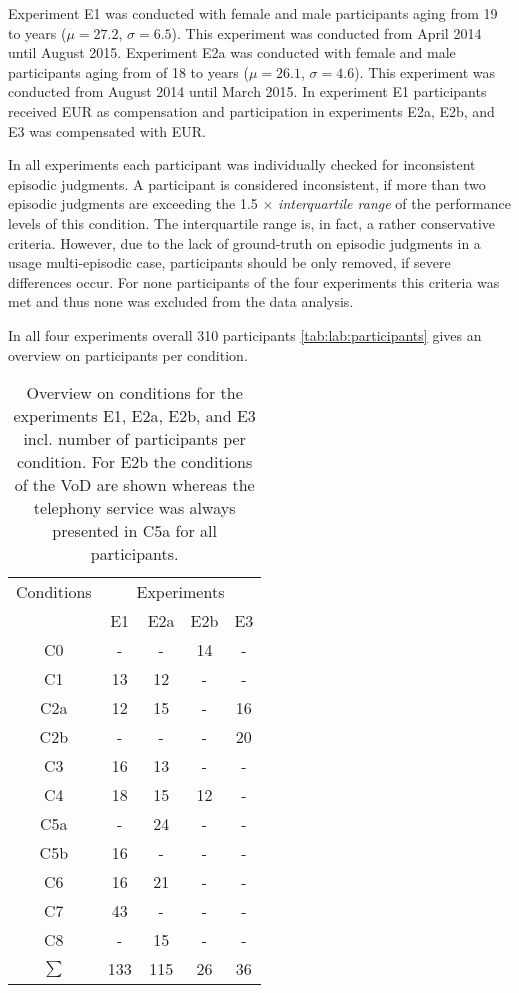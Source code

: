 Experiment E1 was conducted  with \unit[59]{female} and \unit[40]{male} participants aging from 19 to \unit[53]{years} ($\mu=27.2$, $\sigma=6.5$). %
This experiment was conducted from April 2014 until August 2015.
Experiment E2a was conducted with \unit[65]{female} and \unit[35]{male} participants aging from of 18 to \unit[50]{years} ($\mu=26.1$, $\sigma=4.6$). %
This experiment was conducted from August 2014 until March 2015.
In experiment E1 participants received \unit[15]{EUR} as compensation and participation in experiments E2a, E2b, and E3 was compensated with \unit[10]{EUR}.


In all experiments each participant was individually checked for inconsistent episodic judgments.
A participant is considered inconsistent, if more than two episodic judgments are exceeding the 1.5 $\times$ \emph{interquartile range} of the performance levels of this condition. %
The interquartile range is, in fact, a rather conservative criteria.
However, due to the lack of ground-truth on episodic judgments in a usage multi-episodic case, participants should be only removed, if severe differences occur.
For none participants of the four experiments this criteria was met and thus none was excluded from the data analysis.

In all four experiments overall 310 participants 
\autoref{tab:lab:participants} gives an overview on participants per condition.

\begin{table}
	\centering
	\begin{tabular}{c|c|c|c|c}
	Conditions & \multicolumn{4}{c}{Experiments} \\
			& E1	& E2a 	& E2b 	& E3\\
	\midrule
	C0		& -		& 	-	& 	14	&  - \\
	C1		& 13	&	12	&	-	&  - \\
	C2a		& 12	&	15	&	-	&  16\\
	C2b		& -		&	-	&	-	&  20\\
	C3		& 16	&	13	&	-	&  - \\
	C4		& 18	&	15	&	12	&  - \\
	C5a		& -		&	24	&	-	&  - \\
	C5b		& 16	&	-	&	-	&  - \\
	C6		& 16	&	21	&	-	&  - \\
	C7		& 43	&	-	&	-	&  - \\
	C8		& -		&	15 &	-	&  - \\ %
	\midrule
	$\sum$ 	& 133	&	115 &	26 	& 36 \\
	\end{tabular} %
	\caption{
	Overview on conditions for the experiments E1, E2a, E2b, and E3 incl. number of participants per condition.
	For E2b the conditions of the \ac{VoD} are shown whereas the telephony service was always presented in C5a for all participants.}
	\label{tab:lab:participants}
\end{table}

